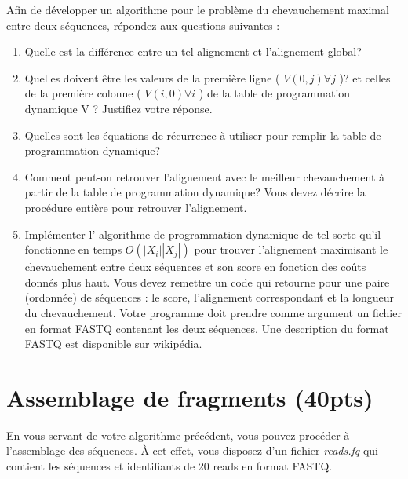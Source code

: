 \documentclass[12pt]{article}
\begin{document}
Afin de développer un algorithme pour le problème du chevauchement
maximal entre deux séquences, répondez aux questions suivantes :
\begin{enumerate}


	\item  Quelle est la différence entre un tel alignement et l'alignement global?
	\item  Quelles doivent être les valeurs de la première ligne ( $V (0,j) \forall
		      j$ )? et
	      celles de la première colonne ( $V (i, 0) \forall i$ ) de la table de
	      programmation
	      dynamique V ? Justifiez votre réponse.
	\item  Quelles sont les équations de récurrence à utiliser pour remplir la table
	      de programmation dynamique?
	\item  Comment peut-on retrouver l'alignement avec le meilleur chevauchement à
	      partir de la table de programmation dynamique? Vous devez
	      décrire la procédure entière pour retrouver l'alignement.
	\item  Implémenter l' algorithme de programmation dynamique de tel sorte qu'il fonctionne en temps $O(|X_i||X_j|)$ pour trouver l'alignement maximisant le
	      chevauchement entre deux séquences et son score en fonction des coûts
	      donnés plus haut. Vous devez remettre un code qui retourne pour une
	      paire (ordonnée) de séquences : le score, l'alignement correspondant et la longueur du
	      chevauchement. Votre programme doit prendre comme
	      argument un fichier en format FASTQ contenant les deux séquences. Une description du format FASTQ est disponible
	      sur
	      \href{https://fr.wikipedia.org/wiki/FASTQ#Exemple_type}{wikipédia}.

\end{enumerate}



\section*{Assemblage de fragments (40pts)}

En vous servant de votre algorithme précédent, vous pouvez procéder à l'assemblage des séquences. À cet effet,
vous
disposez d'un fichier {\it reads.fq} qui contient les séquences et identifiants
de 20 reads en format FASTQ.
\end{document}
